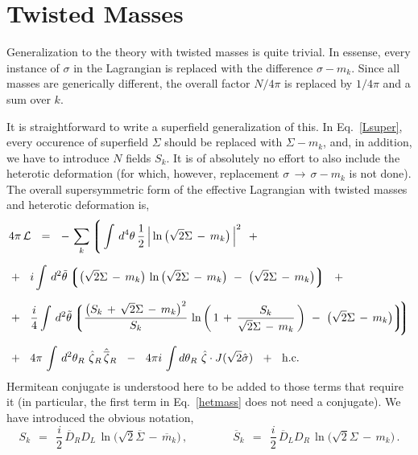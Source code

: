 \documentclass[epsfig,12pt]{article}
\def\beq{\begin{equation}}
\def\eeq{\end{equation}}
\newcommand{\cell}{{\mathcal L}}
\newcommand{\ov}{\overline}
\newcommand{\lgr}{\left\lgroup}
\newcommand{\rgr}{\right\rgroup}
\newcommand{\hsigma}{\hat\sigma{}}
\newcommand{\hzeta}{\hat\zeta{}}
\newcommand{\hbzeta}{\hat{\ov\zeta}{}}
\begin{document}
\section{Twisted Masses}
	
	Generalization to the theory with twisted masses is quite trivial. 
	In essense, every instance of $ \sigma $ in the Lagrangian is replaced
	with the difference $ \sigma - m_k $.
	Since all masses are generically different, the overall factor $ N/4\pi $ is
	replaced by $ 1/4\pi $ and a sum over $ k $.

	It is straightforward to write a superfield generalization of this.
	In Eq.~\eqref{Lsuper}, every occurence of superfield $ \Sigma $ 
	should be replaced with $ \Sigma - m_k $, and, in addition,
	we have to introduce $ N $ fields $ S_k $.
	It is of absolutely no effort to also include the heterotic deformation
	(for which, however, replacement $ \sigma \,\to\, \sigma - m_k $ is not done).
	The overall supersymmetric form of the effective Lagrangian with 
	twisted masses and heterotic deformation is,
\begin{align}
%
\notag
	& 4\pi\, \cell    ~~=~~     
			-\, \sum_k \Bigg\lgroup
			\int\, d^4\theta\, \frac{1}{2}\, \Big| \ln \big(\sqrt{2}\Sigma \,-\, m_k \big)\, \Big|^2
			~~+
	\\[2mm]
%
\label{hetmass}
			&
			+~~
			i \int\, d^2\tilde\theta 
			\lgr
			\big( \sqrt{2}\Sigma \,-\, m_k \big)\, \ln \big( \sqrt{2}\Sigma \,-\, m_k \big)  ~-~ 
					\big( \sqrt{2}\Sigma \,-\, m_k \big)
			\rgr
			~~+
	\\[2mm]
%
\notag
			&
			+~~ 
			\frac{i}{4} \int\, d^2\tilde\theta\,
			\bigg\lgroup \frac{ \big( S_k \,+\, \sqrt{2}\Sigma \,-\, m_k \big)^2 }{ S_k }\,
				\ln \left(\, 1 \,+\, \frac{S_k}{\sqrt{2}\Sigma \,-\, m_k} \,\right) ~-~
				\big(\sqrt{2}\Sigma \,-\, m_k\big) \bigg\rgroup \!\! \Bigg\rgroup
	\\[2mm]
%
\notag
			&
			+~~
			4\pi\, \int\, d^2\theta_R\,\, \hzeta_R\, \hbzeta_R
			~~-~~
			4\pi i\, \int d\theta_R\,\, \hzeta\cdot J(\sqrt{2}\hsigma)
			~~+~~
			\text{h.c.}
\end{align}
	Hermitean conjugate is understood here to be added to those terms that require it
	(in particular, the first term in Eq.~\eqref{hetmass} does not need a conjugate).
	We have introduced the obvious notation,
\beq
	S_k    ~~=~~    \frac{i}{2}\, \ov D{}_R D_L\, \ln \big( \sqrt{2}\ov\Sigma \,-\, \ov m{}_k \big)\,,
	\qquad\qquad
	\ov S{}_k    ~~=~~    \frac{i}{2}\, \ov D{}_L D_R\, \ln \big( \sqrt{2}\Sigma \,-\, m_k \big)\,.
\eeq
\end{document}
